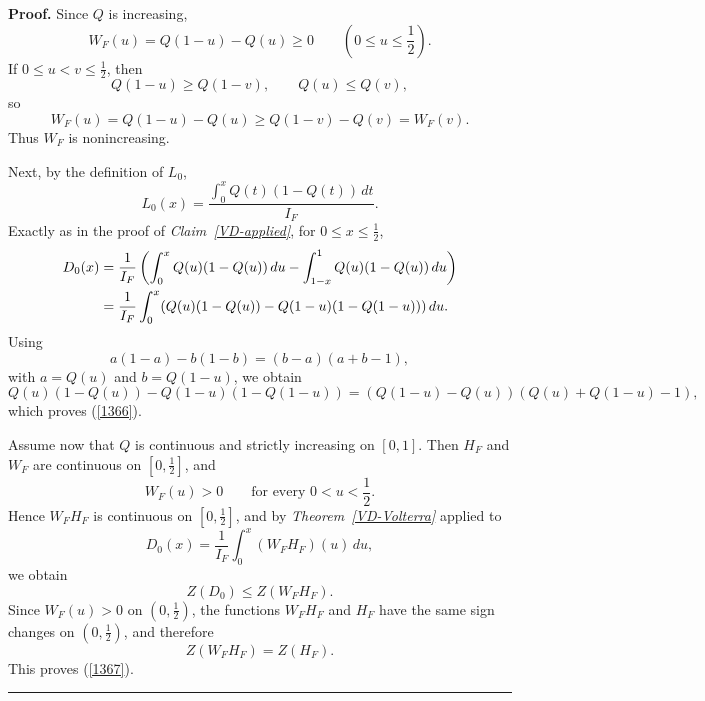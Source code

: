 \documentclass[onecolumn]{article}
\newenvironment{proof}[1][Proof]{\noindent\textbf{#1.} }{\ \rule{0.5em}{0.5em}}
\begin{document}
\begin{proof}
Since $Q$ is increasing, 
\begin{equation}
W_{F}(u)=Q(1-u)-Q(u)\geq 0\qquad \left( 0\leq u\leq \frac{1}{2}\right) .
\label{1368}
\end{equation}%
If $0\leq u<v\leq \tfrac{1}{2}$, then 
\begin{equation}
Q(1-u)\geq Q(1-v),\qquad Q(u)\leq Q(v),  \label{1369}
\end{equation}%
so 
\begin{equation}
W_{F}(u)=Q(1-u)-Q(u)\geq Q(1-v)-Q(v)=W_{F}(v).  \label{1370}
\end{equation}%
Thus $W_{F}$ is nonincreasing.

Next, by the definition of $L_{0}$, 
\begin{equation}
L_{0}(x)=\frac{\int_{0}^{x}Q(t)(1-Q(t))\,dt}{I_{F}}.  \label{1371}
\end{equation}%
Exactly as in the proof of \textit{Claim~\ref{VD-applied}}, for $0\leq x\leq 
\tfrac{1}{2}$, 
\begin{align}
D_{0}(x)& =\frac{1}{I_{F}}\left(
\int_{0}^{x}Q(u)(1-Q(u))\,du-\int_{1-x}^{1}Q(u)(1-Q(u))\,du\right)  \notag \\
& =\frac{1}{I_{F}}\int_{0}^{x}(Q(u)(1-Q(u))-Q(1-u)(1-Q(1-u)))\,du.
\label{1372}
\end{align}%
Using 
\begin{equation}
a(1-a)-b(1-b)=(b-a)(a+b-1),  \label{1373}
\end{equation}%
with $a=Q(u)$ and $b=Q(1-u)$, we obtain 
\begin{equation}
Q(u)(1-Q(u))-Q(1-u)(1-Q(1-u))=(Q(1-u)-Q(u))(Q(u)+Q(1-u)-1),  \label{1374}
\end{equation}%
which proves (\ref{1366}).

Assume now that $Q$ is continuous and strictly increasing on $[0,1]$. Then $%
H_{F}$ and $W_{F}$ are continuous on $[0,\tfrac{1}{2}]$, and 
\begin{equation}
W_{F}(u)>0\qquad \text{for every }0<u<\frac{1}{2}.  \label{1375}
\end{equation}%
Hence $W_{F}H_{F}$ is continuous on $[0,\tfrac{1}{2}]$, and by \textit{%
Theorem~\ref{VD-Volterra}} applied to 
\begin{equation}
D_{0}(x)=\frac{1}{I_{F}}\int_{0}^{x}(W_{F}H_{F})(u)\,du,  \label{1376}
\end{equation}%
we obtain 
\begin{equation}
Z(D_{0})\leq Z(W_{F}H_{F}).  \label{1377}
\end{equation}%
Since $W_{F}(u)>0$ on $(0,\tfrac{1}{2})$, the functions $W_{F}H_{F}$ and $%
H_{F}$ have the same sign changes on $(0,\tfrac{1}{2})$, and therefore 
\begin{equation}
Z(W_{F}H_{F})=Z(H_{F}).  \label{1378}
\end{equation}%
This proves (\ref{1367}). \hfill \hfill
\end{proof}
\end{document}
